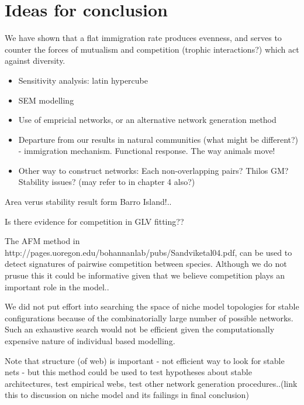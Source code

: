

\section{Ideas for conclusion}
\label{sec:conc_ideas}

We have shown that a flat immigration rate produces evenness, and serves to counter the forces of mutualism and competition (trophic interactions?) which act against diversity.

\begin{itemize}
	\item Sensitivity analysis: latin hypercube
	\item SEM modelling
	\item Use of empricial networks, or an alternative network generation method
	
	\item Departure from our results in natural communities (what might be different?) - immigration mechanism. Functional response. The way animals move!
	
	\item Other way to construct networks: Each non-overlapping pairs? Thilos GM? Stability issues? (may refer to in chapter 4 also?)
\end{itemize}

Area verus stability result form Barro Island!..

Is there evidence for competition in GLV fitting??

The AFM method in http://pages.uoregon.edu/bohannanlab/pubs/Sandviketal04.pdf, can be used to detect signatures of pairwise competition between species. Although we do not prusue this it could be informative given that we believe competition plays an important role in the model..

We did not put effort into searching the space of niche model topologies for stable configurations because of the combinatorially large number of possible networks. Such an exhaustive search would not be efficient given the computationally expensive nature of individual based modelling.  

Note that structure (of web) is important - not efficient way to look for stable nets - but this method could be used to test hypotheses about stable architectures, test empirical webs, test other network generation procedures..(link this to discussion on niche model and its failings in final conclusion)



